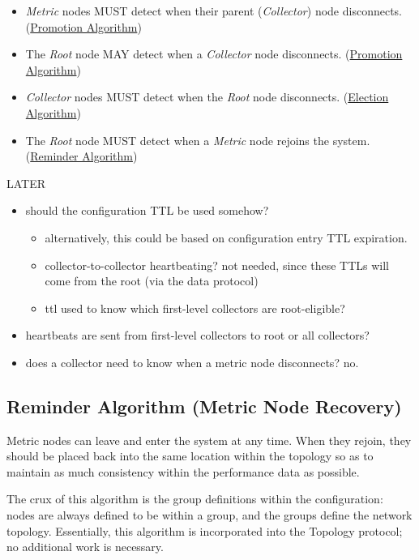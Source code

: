 \begin{itemize}
\item \textit{Metric} nodes MUST detect when their parent (\textit{Collector}) node disconnects.
      (\hyperref[algor_promo]{Promotion Algorithm})
\item The \textit{Root} node MAY detect when a \textit{Collector} node disconnects. (\hyperref[algor_promo]{Promotion
      Algorithm})
\item \textit{Collector} nodes MUST detect when the \textit{Root} node disconnects. (\hyperref[algor_elect]{Election
      Algorithm})
\item The \textit{Root} node MUST detect when a \textit{Metric} node rejoins the system.
      (\hyperref[algor_remind]{Reminder Algorithm})
\end{itemize}

LATER

\begin{itemize}
\item should the configuration TTL be used somehow?
      \begin{itemize}
      \item alternatively, this could be based on configuration entry TTL expiration.
      \item collector-to-collector heartbeating? not needed, since these TTLs will come from the root (via the data protocol)
      \item ttl used to know which first-level collectors are root-eligible?
      \end{itemize}
\item heartbeats are sent from first-level collectors to root or all collectors?
\item does a collector need to know when a metric node disconnects? no.
\end{itemize}

\subsection{Reminder Algorithm (Metric Node Recovery)}
\label{algor_remind}

Metric nodes can leave and enter the \dcamp system at any time. When they rejoin, they should be placed back into the
same location within the topology so as to maintain as much consistency within the performance data as possible.

The crux of this algorithm is the group definitions within the \dcamp configuration: nodes are always defined to be
within a group, and the groups define the network topology. Essentially, this algorithm is incorporated into the
Topology protocol; no additional work is necessary.

